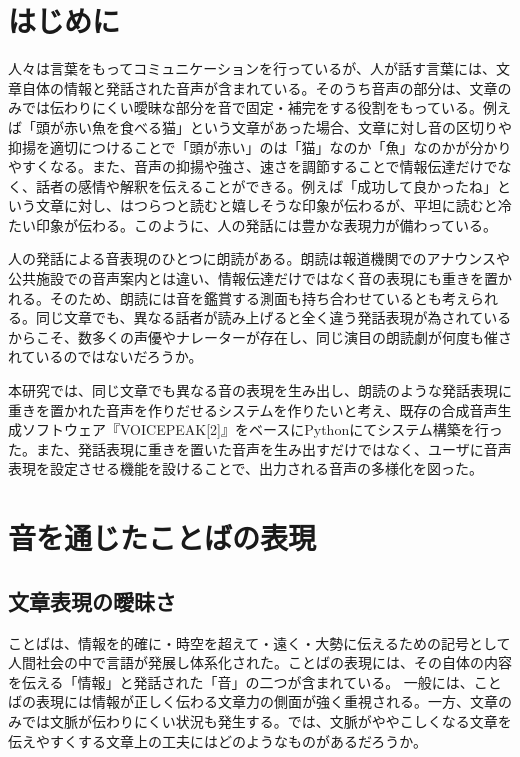 



\section{はじめに}

人々は言葉をもってコミュニケーションを行っているが、人が話す言葉には、文章自体の情報と発話された音声が含まれている。そのうち音声の部分は、文章のみでは伝わりにくい曖昧な部分を音で固定・補完をする役割をもっている。例えば「頭が赤い魚を食べる猫」\cite{twitter}という文章があった場合、文章に対し音の区切りや抑揚を適切につけることで「頭が赤い」のは「猫」なのか「魚」なのかが分かりやすくなる。また、音声の抑揚や強さ、速さを調節することで情報伝達だけでなく、話者の感情や解釈を伝えることができる。例えば「成功して良かったね」という文章に対し、はつらつと読むと嬉しそうな印象が伝わるが、平坦に読むと冷たい印象が伝わる。このように、人の発話には豊かな表現力が備わっている。

人の発話による音表現のひとつに朗読がある。朗読は報道機関でのアナウンスや公共施設での音声案内とは違い、情報伝達だけではなく音の表現にも重きを置かれる。そのため、朗読には音を鑑賞する測面も持ち合わせているとも考えられる。同じ文章でも、異なる話者が読み上げると全く違う発話表現が為されているからこそ、数多くの声優やナレーターが存在し、同じ演目の朗読劇が何度も催されているのではないだろうか。

本研究では、同じ文章でも異なる音の表現を生み出し、朗読のような発話表現に重きを置かれた音声を作りだせるシステムを作りたいと考え、既存の合成音声生成ソフトウェア『VOICEPEAK[2]』をベースにPythonにてシステム構築を行った。また、発話表現に重きを置いた音声を生み出すだけではなく、ユーザに音声表現を設定させる機能を設けることで、出力される音声の多様化を図った。




\section{音を通じたことばの表現}
\subsection{文章表現の曖昧さ}
ことばは、情報を的確に・時空を超えて・遠く・大勢に伝えるための記号として人間社会の中で言語が発展し体系化された。ことばの表現には、その自体の内容を伝える「情報」と発話された「音」の二つが含まれている。
一般には、ことばの表現には情報が正しく伝わる文章力の側面が強く重視される。一方、文章のみでは文脈が伝わりにくい状況も発生する。では、文脈がややこしくなる文章を伝えやすくする文章上の工夫にはどのようなものがあるだろうか。

